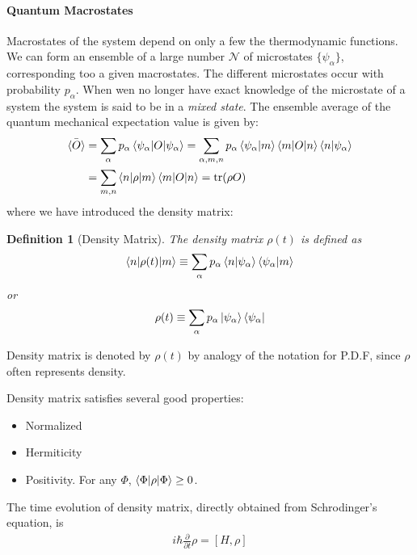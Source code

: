 \documentclass{article}
\numberwithin{equation}{subsection} %
\newtheorem{defi}{Definition}[section]
\theoremstyle{definition}
\begin{document}
    \paragraph{Quantum Macrostates}
    Macrostates of the system depend on only a few the thermodynamic
    functions. We can form an ensemble of a large number $\mathcal{N}$ of
    microstates $\{\psi_\alpha\}$, corresponding too a given macrostates.
    The different microstates occur with probability $p_\alpha$.
    When wen no longer have exact knowledge of the microstate of a
    system the system is said to be in a \textit{mixed state}.
    The ensemble average of the quantum mechanical expectation
    value is given by:
    \begin{align}
        \label{eq:quantum_macrostates_ensemble_avg}
        \bar{\braket{O}} &= 
            \sum_\alpha p_\alpha \braket{\psi_\alpha|O|\psi_\alpha}
            = \sum_{\alpha,m,n} p_\alpha
                \braket{\psi_\alpha|m}\braket{m|O|n}\braket{n|\psi_\alpha}
                \nonumber\\
            &= \sum_{m,n} \braket{n|\rho|m}\braket{m|O|n}
                = \text{tr}(\rho O)
    \end{align}
    where we have introduced the density matrix:
    \begin{defi}[Density Matrix]
        The density matrix $\rho(t)$ is defined as
        \begin{align}
            \label{eq:density_matrix_def}
        \braket{n|\rho(t)|m} \equiv
        \sum_\alpha p_\alpha \braket{n|\psi_\alpha} \braket{\psi_\alpha|m}
        \end{align}
        or
        \begin{align}
            \label{eq:density_matrix_def_2}
            \rho(t) \equiv \sum_\alpha p_\alpha
                \ket{\psi_\alpha}\bra{\psi_\alpha}
        \end{align}
    \end{defi}
    Density matrix is denoted by $\rho(t)$ by analogy of the notation for
    P.D.F, since $\rho$ often represents density.
    
    Density matrix satisfies several good properties:
    \begin{itemize}
        \item Normalized
        \item Hermiticity
        \item Positivity. For any $\Phi$, $\braket{\Phi|\rho|\Phi} \geq 0$.
    \end{itemize}
    The time evolution of density matrix, directly obtained from Schrodinger's
    equation, is
    \begin{align}
        \label{eq:quantum_macrostates:density_matrix:evolution}
        i\hbar \frac{\partial}{\partial t}\rho = [H,\rho]
    \end{align}
\end{document}
